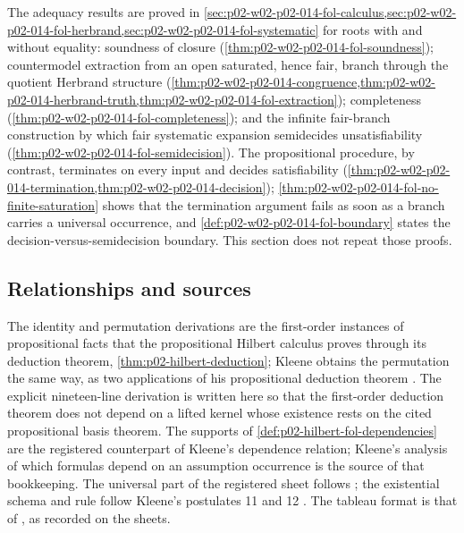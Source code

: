 The adequacy results are proved in
\cref{sec:p02-w02-p02-014-fol-calculus,sec:p02-w02-p02-014-fol-herbrand,sec:p02-w02-p02-014-fol-systematic}
for roots with and without equality: soundness of closure
(\cref{thm:p02-w02-p02-014-fol-soundness}); countermodel extraction from an
open saturated, hence fair, branch through the quotient Herbrand structure
(\cref{thm:p02-w02-p02-014-congruence,thm:p02-w02-p02-014-herbrand-truth,thm:p02-w02-p02-014-fol-extraction});
completeness (\cref{thm:p02-w02-p02-014-fol-completeness}); and the infinite
fair-branch construction by which fair systematic expansion semidecides
unsatisfiability (\cref{thm:p02-w02-p02-014-fol-semidecision}).  The
propositional procedure, by contrast, terminates on every input and decides
satisfiability (\cref{thm:p02-w02-p02-014-termination,thm:p02-w02-p02-014-decision});
\cref{thm:p02-w02-p02-014-fol-no-finite-saturation} shows that the
termination argument fails as soon as a branch carries a universal
occurrence, and \cref{def:p02-w02-p02-014-fol-boundary} states the
decision-versus-semidecision boundary.  This section does not repeat those
proofs.

\subsection{Relationships and sources}
\label{sec:p02-w02-p02-025-relations}

The identity and permutation derivations are the first-order instances of
propositional facts that the propositional Hilbert calculus proves through
its deduction theorem, \cref{thm:p02-hilbert-deduction}; Kleene obtains the
permutation the same way, as two applications of his propositional deduction
theorem \cite[\S 21, p.~93]{Kleene1952}.  The explicit nineteen-line
derivation is written here so that the first-order deduction theorem does
not depend on a lifted kernel whose existence rests on the cited
propositional basis theorem.  The supports of
\cref{def:p02-hilbert-fol-dependencies} are the registered counterpart of
Kleene's dependence relation; Kleene's analysis of which formulas depend on
an assumption occurrence is the source of that bookkeeping.  The universal
part of the registered sheet follows \cite{Mendelson1997}; the existential
schema and rule follow Kleene's postulates 11 and 12
\cite[\S 19, p.~82]{Kleene1952}.  The tableau format is that of
\cite{Smullyan1968}, as recorded on the sheets.
